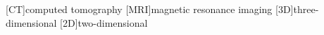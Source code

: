 \begin{acronym}
    [CT]{computed tomography}
    [MRI]{magnetic resonance imaging}
    [3D]{three-dimensional}
    [2D]{two-dimensional}
\end{acronym}